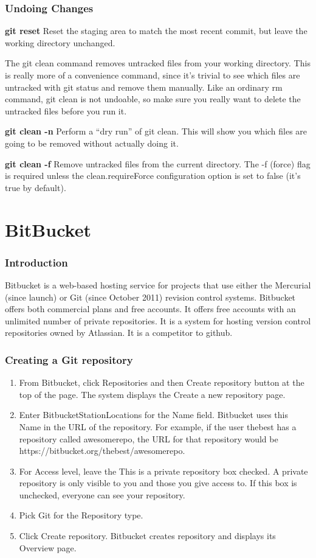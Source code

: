 \documentclass{beamer}
\begin{document}
\begin{frame}
\frametitle{Undoing Changes}
        \textbf{git reset}
		Reset the staging area to match the most recent commit, but leave the working directory unchanged. 

	
		The git clean command removes untracked files from your working directory. This is really more of a convenience command, since it’s trivial to see which files are untracked with git status and remove them manually. Like an ordinary rm command, git clean is not undoable, so make sure you really want to delete the untracked files before you run it.

		\textbf{git clean -n}
		Perform a “dry run” of git clean. This will show you which files are going to be removed without actually doing it.

		\textbf{git clean -f}
		Remove untracked files from the current directory. The -f (force) flag is required unless the clean.requireForce configuration option is set to false (it's true by default).
\end{frame}


\section{BitBucket}
\begin{frame}
\frametitle{Introduction}
	 Bitbucket is a web-based hosting service for projects that use either the Mercurial (since launch) or Git (since October 2011) revision control systems. Bitbucket offers both commercial plans and free accounts. It offers free accounts with an unlimited number of private repositories. It is a system for hosting version control repositories owned by Atlassian. It is a competitor to github.
\end{frame}

\begin{frame}
\frametitle{Creating a Git repository}
 	\begin{enumerate}
 		\item From Bitbucket, click Repositories and then Create repository button at the top of the page.
         The system displays the Create a new repository page.
        \item Enter BitbucketStationLocations for the Name field.
    Bitbucket uses this Name in the URL of the repository. For example, if the user thebest has a repository called awesomerepo, the URL for that repository would be https://bitbucket.org/thebest/awesomerepo.
        \item For Access level, leave the This is a private repository box checked. A private repository is only visible to you and those you give access to. If this box is unchecked, everyone can see your repository.
        \item Pick Git for the Repository type. 
        \item Click Create repository. Bitbucket creates repository and displays its Overview page.
    \end{enumerate}
\end{frame}
\end{document}
